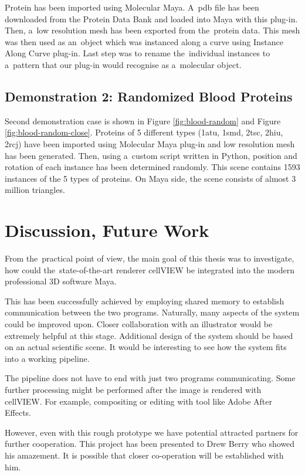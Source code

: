 \documentclass[
  digital, %
  table,   %
  nolof,     %
  nolot,     %
  oneside,
]{fithesis3}
\begin{document}
Protein has been imported using Molecular Maya. A pdb file has been downloaded from the Protein Data Bank and loaded into Maya with this plug-in. Then, a low resolution mesh has been exported from the protein data. This mesh was then used as an object which was instanced along a curve using Instance Along Curve plug-in. Last step was to rename the individual instances to a pattern that our plug-in would recognise as a molecular object.

\section{Demonstration 2: Randomized Blood Proteins}
Second demonstration case is shown in Figure \ref{fig:blood-random} and Figure \ref{fig:blood-random-close}. Proteins of 5 different types (1atu, 1smd, 2tsc, 2hiu, 2rcj) have been imported using Molecular Maya plug-in and low resolution mesh has been generated. Then, using a custom script written in Python, position and rotation of each instance has been determined randomly.
This scene contains 1593 instances of the 5 types of proteins. On Maya side, the scene consists of almost 3 million triangles.

\chapter{Discussion, Future Work}
\label{chap:discussion}
From the practical point of view, the main goal of this thesis was to investigate, how could the state-of-the-art renderer cellVIEW be integrated into the modern professional 3D software Maya.

This has been successfully achieved by employing shared memory to establish communication between the two programs. Naturally, many aspects of the system could be improved upon.
Closer collaboration with an illustrator would be extremely helpful at this stage. Additional design of the system should be based on an actual scientific scene. It would be interesting to see how the system fits into a working pipeline.

The pipeline does not have to end with just two programs communicating. Some further processing might be performed after the image is rendered with cellVIEW. For example, compositing or editing with tool like Adobe After Effects.

However, even with this rough prototype we have potential attracted partners for further cooperation. This project has been presented to Drew Berry who showed his amazement. It is possible that closer co-operation will be established with him.
\end{document}
